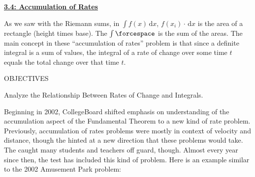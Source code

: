 \textbf{\underline{\large{3.4: Accumulation of Rates}}} \par

As we saw with the Riemann sums, in $\int f(x) \,\mathrm{d}x$, $f(x_i) \cdot \,\mathrm{d}x$ is the area of a rectangle (height times base). The $\int \forcespace$ is the sum of the areas. The main concept in these ``accumulation of rates'' problem is that since a definite integral is a sum of values, the integral of a rate of change over some time $t$ equals the total change over that time $t$. \par

\begin{tcolorbox}[objective]
    \begin{center}
        OBJECTIVES \\[11pt]
    \end{center}
    Analyze the Relationship Between Rates of Change and Integrals. \\
\end{tcolorbox} \vspace{11pt}

Beginning in 2002, CollegeBoard shifted emphasis on understanding of the accumulation aspect of the Fundamental Theorem to a new kind of rate problem. Previously, accumulation of rates problems were mostly in context of velocity and distance, though the \href{https://al048.k12.sd.us/2nd%20semester/End%20of%20the%20year%20review/AP%20Cola%20Problem.pdf}{\text{\textcolor{blue}{1996 Cola Consumption problem}}} hinted at a new direction that these problems would take. The \href{https://maththewongway.weebly.com/uploads/5/1/2/6/5126774/accumulations-net_change_hw.pdf}{\text{\textcolor{blue}{2002 Amusement Park problem}}} caught many students and teachers off guard, though. Almost every year since then, the test has included this kind of problem. Here is an example similar to the 2002 Amusement Park problem: \par

